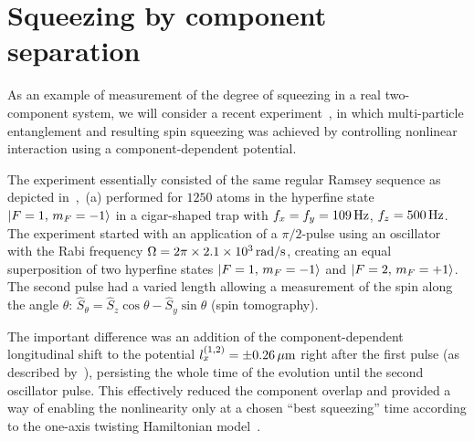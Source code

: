 \section{Squeezing by component separation}
\label{sec:bec-squeezing:separation}

As an example of measurement of the degree of squeezing in a real two-component  system, we will consider a recent experiment~\cite{Riedel2010}, in which multi-particle entanglement and resulting spin squeezing was achieved by controlling nonlinear interaction using a component-dependent potential.

The experiment essentially consisted of the same regular Ramsey sequence as depicted in~,~(a) performed for $1250$ \Rb{} atoms in the hyperfine state ${\mbox{\ensuremath{\left\vert F=1,\, m_F=-1 \right\rangle}}}$ in a cigar-shaped trap with $f_x = f_y = 109\mbox{\ensuremath{\,\mathrm{Hz}}}$, $f_z = 500\mbox{\ensuremath{\,\mathrm{Hz}}}$.
The experiment started with an application of a $\pi/2$-pulse using an oscillator with the Rabi frequency $\Omega=2\pi \times 2.1\times 10^{3}\mbox{\ensuremath{\,\mathrm{rad/s}}}$, creating an equal superposition of two hyperfine states ${\mbox{\ensuremath{\left\vert F=1,\, m_F=-1 \right\rangle}}}$ and ${\mbox{\ensuremath{\left\vert F=2,\, m_F=+1 \right\rangle}}}$.
The second pulse had a varied length allowing a measurement of the spin along the angle $\theta$: $\hat{S}_\theta = \hat{S}_z \cos \theta - \hat{S}_y \sin \theta$ (spin tomography).

The important difference was an addition of the component-dependent longitudinal shift to the potential $l_x^{(1,2)} = \pm 0.26\mbox{\ensuremath{\,\mathrm{\mu m}}}$ right after the first pulse (as described by~), persisting the whole time of the evolution until the second oscillator pulse.
This effectively reduced the component overlap and provided a way of enabling the nonlinearity only at a chosen ``best squeezing'' time according to the one-axis twisting Hamiltonian model~\cite{Kitagawa1993}.

